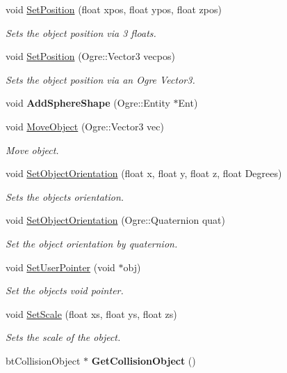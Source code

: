 \begin{DoxyCompactItemize}
void \hyperlink{class_collision_object_a0c9429cee147f5c5d23b36b66151348c}{Set\-Position} (float xpos, float ypos, float zpos)
\begin{DoxyCompactList}\small\item\em Sets the object position via 3 floats. \end{DoxyCompactList}\item 
void \hyperlink{class_collision_object_a42b7b3f3af11bcc551cb05600af39ae6}{Set\-Position} (Ogre\-::\-Vector3 vecpos)
\begin{DoxyCompactList}\small\item\em Sets the object position via an Ogre Vector3. \end{DoxyCompactList}\item 
\hypertarget{class_collision_object_a6bf3394037d2d5a49aae57bbf98126bf}{void {\bfseries Add\-Sphere\-Shape} (Ogre\-::\-Entity $\ast$Ent)}\label{class_collision_object_a6bf3394037d2d5a49aae57bbf98126bf}

\item 
void \hyperlink{class_collision_object_a87925eeb7b7453dac768782671db7498}{Move\-Object} (Ogre\-::\-Vector3 vec)
\begin{DoxyCompactList}\small\item\em Move object. \end{DoxyCompactList}\item 
void \hyperlink{class_collision_object_aa2aeac308fb44ae4829e4f2a55890c56}{Set\-Object\-Orientation} (float x, float y, float z, float Degrees)
\begin{DoxyCompactList}\small\item\em Sets the objects orientation. \end{DoxyCompactList}\item 
void \hyperlink{class_collision_object_aca121d7ab9ae0e0295c6b44de37d2a54}{Set\-Object\-Orientation} (Ogre\-::\-Quaternion quat)
\begin{DoxyCompactList}\small\item\em Set the object orientation by quaternion. \end{DoxyCompactList}\item 
void \hyperlink{class_collision_object_a59db2ca5c552ebd20faf2ac4dae19198}{Set\-User\-Pointer} (void $\ast$obj)
\begin{DoxyCompactList}\small\item\em Set the objects void pointer. \end{DoxyCompactList}\item 
void \hyperlink{class_collision_object_a3c091aaffc9199127d88a090405f5012}{Set\-Scale} (float xs, float ys, float zs)
\begin{DoxyCompactList}\small\item\em Sets the scale of the object. \end{DoxyCompactList}\item 
\hypertarget{class_collision_object_a8271ca0e023aeebb34be4c858e18005a}{bt\-Collision\-Object $\ast$ {\bfseries Get\-Collision\-Object} ()}\label{class_collision_object_a8271ca0e023aeebb34be4c858e18005a}


\end{DoxyCompactItemize}

